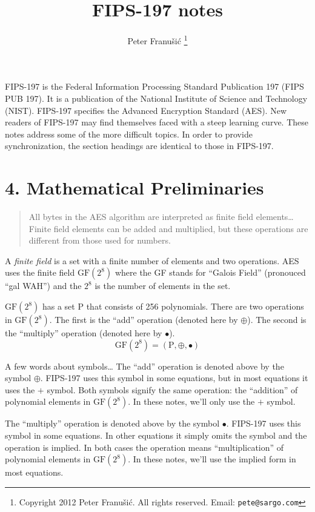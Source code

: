 \documentclass{article}
\title{\textbf{\huge{FIPS-197 notes}}}
\author{Peter Franu\v si\'c
  \footnote{
    Copyright 2012 Peter Franu\v si\'c.
    All rights reserved.
    Email: \texttt{pete@sargo.com}}}
\date{}
\newcommand{\GF}{\mathrm{GF}(2^8)}
\newcommand{\gfadd}{\oplus}
\newcommand{\gfmul}{\bullet}
\begin{document}
\maketitle

FIPS-197 is the Federal Information Processing Standard Publication 197 (FIPS PUB 197).
It is a publication of the National Institute of Science and Technology (NIST).
FIPS-197 specifies the Advanced Encryption Standard (AES).
New readers of FIPS-197 may find themselves faced with a steep learning curve.
These notes address some of the more difficult topics.
In order to provide synchronization, the section headings are identical to 
those in FIPS-197.


\section*{4. Mathematical Preliminaries}

\begin{quote}
  All bytes in the AES algorithm are interpreted as finite field elements\ldots
  Finite field elements can be added and multiplied, but these operations are 
  different from those used for numbers.
\end{quote}

A \emph{finite field} is a set with a finite number of elements and two operations.
AES uses the finite field $\GF$ where the GF stands for ``Galois Field'' (pronouced ``gal WAH'')
and the $2^8$ is the number of elements in the set.

$\GF$ has a set $\mathrm{P}$ that consists of 256 polynomials.
There are two operations in $\GF$.
The first is the ``add'' operation (denoted here by $\gfadd$).
The second is the ``multiply'' operation (denoted here by $\gfmul$).
\[ \GF = (\mathrm{P},\gfadd,\gfmul) \]

A few words about symbols\ldots
The ``add'' operation is denoted above by the symbol $\gfadd$.
FIPS-197 uses this symbol in some equations,
but in most equations it uses the $+$ symbol.
Both symbols signify the same operation: 
the ``addition'' of polynomial elements in $\GF$.
In these notes, we'll only use the $+$ symbol.

\newpage
The ``multiply'' operation is denoted above by the symbol $\gfmul$.
FIPS-197 uses this symbol in some equations.
In other equations it simply omits the symbol and the operation is implied.
In both cases the operation means ``multiplication'' of polynomial elements in $\GF$.
In these notes, we'll use the implied form in most equations.
\end{document}
